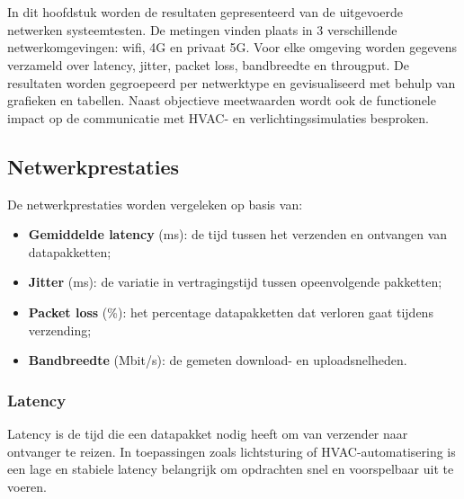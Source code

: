\chapter{}%
\label{ch:resultaten}

In dit hoofdstuk worden de resultaten gepresenteerd van de uitgevoerde netwerken systeemtesten. De metingen vinden plaats in 3 verschillende netwerkomgevingen: wifi, 4G en privaat 5G. Voor elke omgeving worden gegevens verzameld over latency, jitter, packet loss, bandbreedte en througput.
De resultaten worden gegroepeerd per netwerktype en gevisualiseerd met behulp van grafieken en tabellen. Naast objectieve meetwaarden wordt ook de functionele impact op de communicatie met HVAC- en verlichtingssimulaties besproken.


\section{Netwerkprestaties}

De netwerkprestaties worden vergeleken op basis van:

\begin{itemize}
    \item \textbf{Gemiddelde latency} (ms): de tijd tussen het verzenden en ontvangen van datapakketten;
    \item \textbf{Jitter} (ms): de variatie in vertragingstijd tussen opeenvolgende pakketten;
    \item \textbf{Packet loss} (\%): het percentage datapakketten dat verloren gaat tijdens verzending;
    \item \textbf{Bandbreedte} (Mbit/s): de gemeten download- en uploadsnelheden.
\end{itemize}

\subsection{Latency}
Latency is de tijd die een datapakket nodig heeft om van verzender naar ontvanger te reizen. In toepassingen zoals lichtsturing of HVAC-automatisering is een lage en stabiele latency belangrijk om opdrachten snel en voorspelbaar uit te voeren.

